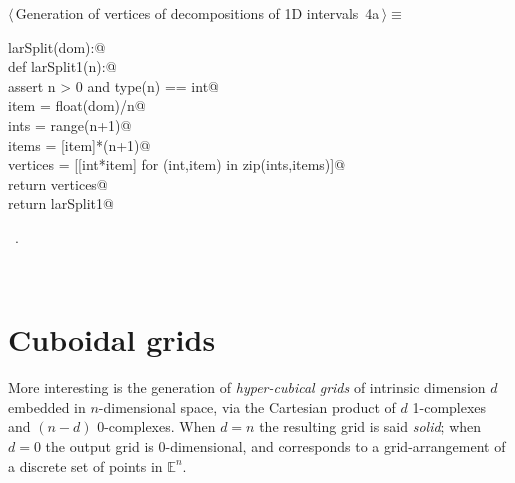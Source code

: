 \documentclass[11pt,oneside]{article}	%
\def\E{\mathbb{E}}
\begin{document}
\begin{flushleft} \small
\begin{minipage}{\linewidth} \label{scrap4}
\protect{}$\langle\,$Generation of vertices of decompositions of 1D intervals\nobreak\ {\footnotesize 4a}$\,\rangle\equiv$
\vspace{-1ex}
\begin{list}{}{} \item
\mbox{}\verb@def larSplit(dom):@\\
\mbox{}\verb@    def larSplit1(n):@\\
\mbox{}\verb@        assert n > 0 and type(n) == int@\\
\mbox{}\verb@        item = float(dom)/n@\\
\mbox{}\verb@        ints = range(n+1)@\\
\mbox{}\verb@        items = [item]*(n+1)@\\
\mbox{}\verb@        vertices = [[int*item] for (int,item) in zip(ints,items)]@\\
\mbox{}\verb@        return vertices@\\
\mbox{}\verb@    return larSplit1@\\
\mbox{}\verb@@{\NWsep}
\end{list}
\vspace{-1ex}
\footnotesize\addtolength{\baselineskip}{-1ex}
\begin{list}{}{\setlength{\itemsep}{-\parsep}\setlength{\itemindent}{-\leftmargin}}
\item \NWtxtMacroRefIn\ .
\end{list}
\end{minipage}\\[4ex]
\end{flushleft}


\section{Cuboidal grids}
\label{sec:cuboids}

More interesting is the generation of \emph{hyper-cubical grids} of intrinsic dimension $d$ embedded in $n$-dimensional space, via the Cartesian product of $d$ 1-complexes and $(n-d)$ 0-complexes. When $d=n$ the resulting grid is said \emph{solid}; when $d=0$ the output grid is 0-dimensional, and corresponds to a grid-arrangement of a discrete set of points in $\E^n$.
\end{document}
